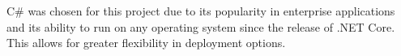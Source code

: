 


C\# was chosen for this project due to its popularity in enterprise applications
and its ability to run on any operating system since the release of .NET Core.
This allows for greater flexibility in deployment options. 
